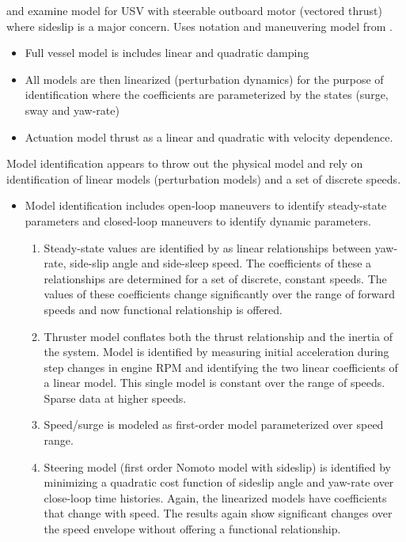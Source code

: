 \documentclass[11pt,draftcls,journal,onecolumn]{IEEEtran}
\begin{document}
\cite{sonnenburg13modeling} and \cite{sonnenburg10control} examine model for USV with steerable outboard motor (vectored thrust) where sideslip is a major concern.  Uses notation and maneuvering model from \cite{fossen94guidance}.
\begin{itemize}
\item Full vessel model is includes linear and quadratic damping
\item All models are then linearized (perturbation dynamics) for the purpose of identification where the coefficients are parameterized by the states (surge, sway and yaw-rate)
\item Actuation model thrust as a linear  and quadratic with velocity dependence.
\end{itemize}
Model identification appears to throw out the physical model and rely on identification of linear models (perturbation models) and a set of discrete speeds.
\begin{itemize}
\item Model identification includes open-loop maneuvers to identify steady-state parameters and closed-loop maneuvers to identify dynamic parameters.
\begin{enumerate}
\item Steady-state values are identified by as linear relationships between yaw-rate, side-slip angle and side-sleep speed.  The coefficients of these a relationships are determined for a set of discrete, constant speeds.  The values of these coefficients change significantly over the range of forward speeds and now functional relationship is offered.  
\item Thruster model conflates both the thrust relationship and the inertia of the system.  Model is identified by measuring initial acceleration during step changes in engine RPM and identifying the two linear coefficients of a linear model.  This single model is constant over the range of speeds.  Sparse data at higher speeds.
\item Speed/surge is modeled as first-order model parameterized over speed range.
\item Steering model (first order Nomoto model with sideslip) is identified by minimizing a quadratic cost function of sideslip angle and yaw-rate over close-loop time histories. Again, the linearized models have coefficients that change with speed.  The results again show significant changes over the speed envelope without offering a functional relationship.
\end{enumerate}
\end{itemize}
\end{document}
